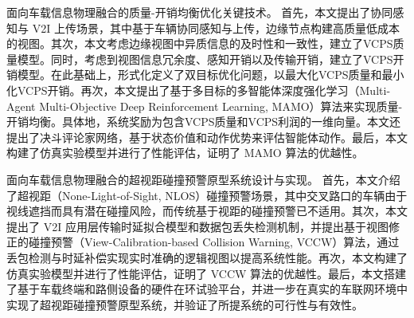 \begin{cabstract}
 面向车载信息物理融合的质量-开销均衡优化关键技术。
首先，本文提出了协同感知与 V2I 上传场景，其中基于车辆协同感知与上传，边缘节点构建高质量低成本的视图。其次，本文考虑边缘视图中异质信息的及时性和一致性，建立了VCPS质量模型。同时，考虑到视图信息冗余度、感知开销以及传输开销，建立了VCPS开销模型。在此基础上，形式化定义了双目标优化问题，以最大化VCPS质量和最小化VCPS开销。再次，本文提出了基于多目标的多智能体深度强化学习（Multi-Agent Multi-Objective Deep Reinforcement Learning, MAMO）算法来实现质量-开销均衡。具体地，系统奖励为包含VCPS质量和VCPS利润的一维向量。本文还提出了决斗评论家网络，基于状态价值和动作优势来评估智能体动作。最后，本文构建了仿真实验模型并进行了性能评估，证明了 MAMO 算法的优越性。

 面向车载信息物理融合的超视距碰撞预警原型系统设计与实现。
首先，本文介绍了超视距（None-Light-of-Sight, NLOS）碰撞预警场景，其中交叉路口的车辆由于视线遮挡而具有潜在碰撞风险，而传统基于视距的碰撞预警已不适用。其次，本文提出了 V2I 应用层传输时延拟合模型和数据包丢失检测机制，并提出基于视图修正的碰撞预警（View-Calibration-based Collision Warning, VCCW）算法，通过丢包检测与时延补偿实现实时准确的逻辑视图以提高系统性能。再次，本文构建了仿真实验模型并进行了性能评估，证明了 VCCW 算法的优越性。最后，本文搭建了基于车载终端和路侧设备的硬件在环试验平台，并进一步在真实的车联网环境中实现了超视距碰撞预警原型系统，并验证了所提系统的可行性与有效性。

\end{cabstract}


